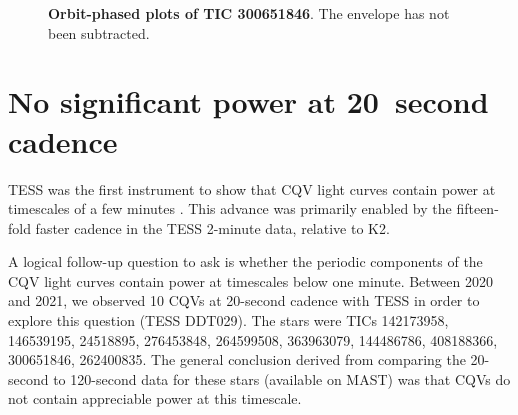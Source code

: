 \documentclass[11pt,twocolumn,tighten]{aastex63}
\begin{document}
\begin{figure*}[!t]
	\begin{center}
	\end{center}
	\vspace{-0.4cm}
	\caption{
		{\bf Orbit-phased plots of TIC 300651846}.
		The envelope has not been subtracted.
	}
	\label{fig:tic3006timegroups}
\end{figure*}


\section{No significant power at 20~second cadence}

TESS was the first instrument to show that CQV light curves contain
power at timescales of a few minutes
\citep{127Z,2020AJ....160...86B,2022AJ....163..144G}.  This advance
was primarily enabled by the fifteen-fold faster cadence in the TESS
2-minute data, relative to K2.

A logical follow-up question to ask is whether the periodic components
of the CQV light curves contain power at timescales below one minute.
Between 2020 and 2021, we observed 10 CQVs at 20-second cadence with
TESS in order to explore this question (TESS DDT029).  The stars were
TICs 142173958, 146539195, 24518895, 276453848, 264599508, 363963079,
144486786, 408188366, 300651846, 262400835.  The general conclusion
derived from comparing the 20-second to 120-second data for these
stars (available on MAST) was that CQVs do not contain appreciable
power at this timescale.

% 
% 
% 
% 



\clearpage
\listofchanges
\end{document}
